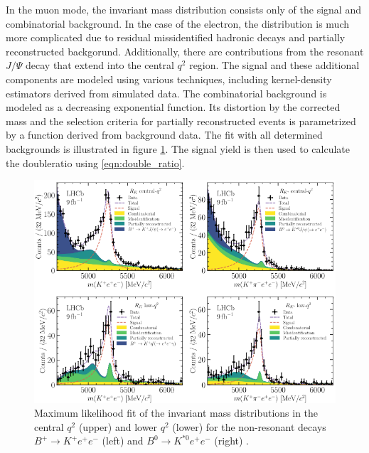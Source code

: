 In the muon mode, the invariant mass distribution consists only of the signal and 
combinatorial background. 
In the case of the electron, the distribution is much more complicated due to 
residual missidentified hadronic decays and partially reconstructed backgorund. 
Additionally, there are contributions from the resonant $J/\Psi$ decay that extend 
into the central $q^2$ region. 
The signal and these additional components are modeled using various techniques, 
including kernel-density estimators derived from simulated data. 
The combinatorial background is modeled as a decreasing exponential function.
Its distortion by the corrected mass and the selection criteria for partially 
reconstructed events is parametrized by a function derived from background data.
The fit with all determined backgrounds is illustrated in figure \ref{fig:fits}.
The signal yield is then used to calculate the doubleratio using \eqref{eqn:double_ratio}.
\begin{figure}
    \centering
    \includegraphics[width=\linewidth]{figures/fits.png}
    \caption{Maximum likelihood fit of the invariant mass distributions in the central $q^2$ (upper) and lower $q^2$ (lower) for the non-resonant decays $B^+\to K^+e^+e^-$ (left) and $B^0\to K^{*0}e^+e^-$ (right) \cite{lhcbcollaboration2022test}.}
    \label{fig:fits}
\end{figure}

